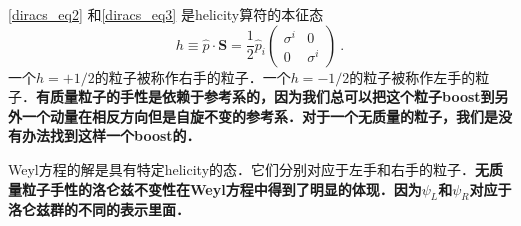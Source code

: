 \autoref{diracs_eq2} 和\autoref{diracs_eq3} 是helicity算符的本征态
\begin{equation}
h\equiv\hat p \cdot \mathbf S = \frac{1}{2} \hat p_i \begin{pmatrix}
\sigma^i & 0 \\
 0 & \sigma^i
\end{pmatrix}~.
\end{equation}
一个$h=+1/2$的粒子被称作右手的粒子．一个$h=-1/2$的粒子被称作左手的粒子．\textbf{有质量粒子的手性是依赖于参考系的，因为我们总可以把这个粒子boost到另外一个动量在相反方向但是自旋不变的参考系．对于一个无质量的粒子，我们是没有办法找到这样一个boost的．}

Weyl方程的解是具有特定helicity的态．它们分别对应于左手和右手的粒子．\textbf{无质量粒子手性的洛仑兹不变性在Weyl方程中得到了明显的体现．因为$\psi_L$和$\psi_R$对应于洛仑兹群的不同的表示里面．}

